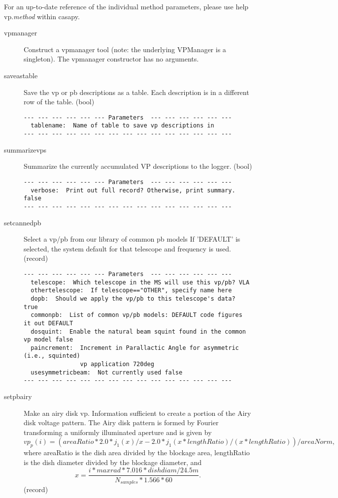 \documentclass[12pt]{article}
\begin{document}
For an up-to-date reference of the individual method parameters, please use help vp.{\it method}
within casapy. 
 
\begin{description}
\item[vpmanager]
   Construct a vpmanager tool (note: the underlying VPManager is a singleton).
   The vpmanager constructor has no arguments.
 
  \item[saveastable]
Save the vp or pb descriptions as a table.  Each description is in a different
row of the table. (bool)
{\small
\begin{verbatim}
--- --- --- --- --- --- Parameters  --- --- --- --- --- ---
  tablename:  Name of table to save vp descriptions in 
--- --- --- --- --- --- --- --- --- --- --- --- --- --- ---
\end{verbatim} 
}
 
  \item[summarizevps]
Summarize the currently accumulated VP descriptions to the logger. (bool)
{\small
\begin{verbatim}
--- --- --- --- --- --- Parameters  --- --- --- --- --- ---
  verbose:  Print out full record? Otherwise, print summary. false 
--- --- --- --- --- --- --- --- --- --- --- --- --- --- ---
\end{verbatim} 
} 
 
  \item[setcannedpb]
   Select a vp/pb from our library of common pb models
   If 'DEFAULT' is selected, the system default for that telescope and frequency is used. (record)
{\small
\begin{verbatim}
--- --- --- --- --- --- Parameters  --- --- --- --- --- ---
  telescope:  Which telescope in the MS will use this vp/pb? VLA 
  othertelescope:  If telescope=="OTHER", specify name here 
  dopb:  Should we apply the vp/pb to this telescope's data? true 
  commonpb:  List of common vp/pb models: DEFAULT code figures it out DEFAULT 
  dosquint:  Enable the natural beam squint found in the common vp model false 
  paincrement:  Increment in Parallactic Angle for asymmetric (i.e., squinted) 
                vp application 720deg 
  usesymmetricbeam:  Not currently used false 
--- --- --- --- --- --- --- --- --- --- --- --- --- --- ---
\end{verbatim} 
} 

 
  \item[setpbairy]
   Make an airy disk vp.   
   Information sufficient to create a portion of the Airy disk voltage pattern.
   The Airy disk pattern is formed by Fourier transforming a uniformly illuminated
   aperture and is given by
   \begin{equation}
     vp_p(i) = ( areaRatio * 2.0 * j_{1}(x)/x 
     - 2.0 * j_{1}(x*lengthRatio)/(x*lengthRatio) )/ areaNorm,
   \end{equation}
   where areaRatio is the dish area divided by the blockage area, lengthRatio
   is the dish diameter divided by the blockage diameter, and 
   \begin{equation}
     x = \frac{i * maxrad * 7.016 * dishdiam/24.5m}{N_{samples} * 1.566 * 60}.
   \end{equation}
   (record)
 

\end{description}
\end{document}
